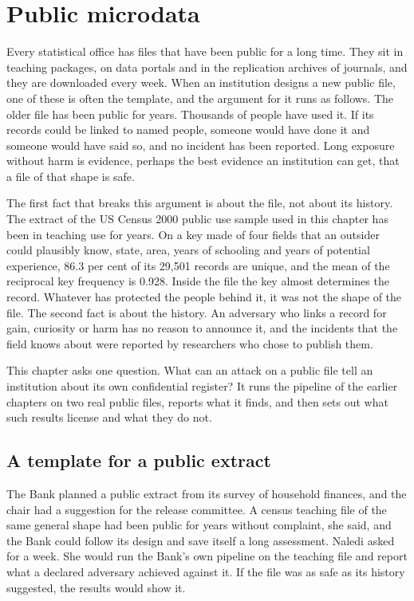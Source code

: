 \chapter{Public microdata}\label{ch:public}

Every statistical office has files that have been public for a long time. They sit
in teaching packages, on data portals and in the replication archives of journals,
and they are downloaded every week. When an institution designs a new public file,
one of these is often the template, and the argument for it runs as follows. The
older file has been public for years. Thousands of people have used it. If its
records could be linked to named people, someone would have done it and someone
would have said so, and no incident has been reported. Long exposure without harm
is evidence, perhaps the best evidence an institution can get, that a file of that
shape is safe.

The first fact that breaks this argument is about the file, not about its history.
The extract of the US Census 2000 public use sample used in this chapter has been in
teaching use for years. On a key made of four fields that an outsider could plausibly
know, state, area, years of schooling and years of potential experience, 86.3 per
cent of its 29,501 records are unique, and the mean of the reciprocal key frequency
is 0.928.
Inside the file the key almost determines the record. Whatever has protected the
people behind it, it was not the shape of the file. The second fact is about the
history. An adversary who links a record for gain, curiosity or harm has no reason to
announce it, and the incidents that the field knows about were reported by
researchers who chose to publish them.

This chapter asks one question. What can an attack on a public file tell an
institution about its own confidential register? It runs the pipeline of the
earlier chapters on two real public files, reports what it finds, and then sets out
what such results license and what they do not.

\section{A template for a public extract}

The Bank planned a public extract from its survey of household finances, and the
chair had a suggestion for the release committee. A census teaching file of the same
general shape had been public for years without complaint, she said, and the Bank
could follow its design and save itself a long assessment. Naledi asked for a week.
She would run the Bank's own pipeline on the teaching file and report what a declared
adversary achieved against it. If the file was as safe as its history suggested, the
results would show it.

